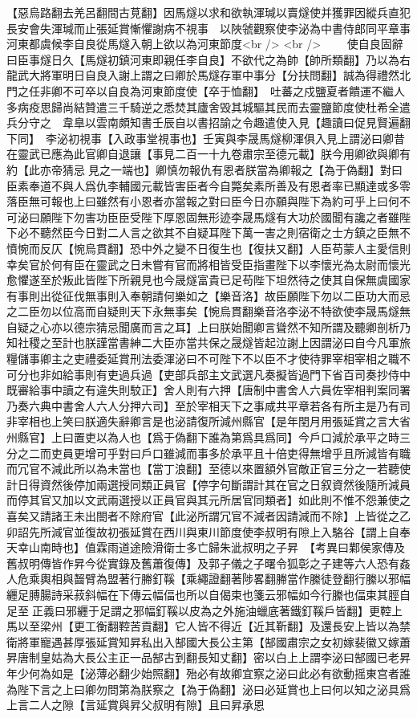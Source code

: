 【惡烏路翻去羌呂翻間古莧翻】因馬燧以求和欲執渾瑊以賣燧使并獲罪因縱兵直犯長安會失渾瑊而止張延賞慚懼謝病不視事　以陜虢觀察使李泌為中書侍郎同平章事河東都虞候李自良從馬燧入朝上欲以為河東節度<br />
<br />
　　使自良固辭曰臣事燧日久【馬燧初鎮河東即親任李自良】不欲代之為帥【帥所類翻】乃以為右龍武大將軍明日自良入謝上謂之曰卿於馬燧存軍中事分【分扶問翻】誠為得禮然北門之任非卿不可卒以自良為河東節度使【卒于恤翻】　吐蕃之戍鹽夏者饋運不繼人多病疫思歸尚結贊遣三千騎逆之悉焚其廬舍毁其城驅其民而去靈鹽節度使杜希全遣兵分守之　韋臯以雲南頗知書壬辰自以書招諭之令趣遣使入見【趣讀曰促見賢遍翻下同】　李泌初視事【入政事堂視事也】壬寅與李晟馬燧柳渾俱入見上謂泌曰卿昔在靈武已應為此官卿自退讓【事見二百一十九卷肅宗至德元載】朕今用卿欲與卿有約【此亦帝猜忌見之一端也】卿慎勿報仇有恩者朕當為卿報之【為于偽翻】對曰臣素奉道不與人爲仇李輔國元載皆害臣者今自斃矣素所善及有恩者率已顯達或多零落臣無可報也上曰雖然有小恩者亦當報之對曰臣今日亦願與陛下為約可乎上曰何不可泌曰願陛下勿害功臣臣受陛下厚恩固無形迹李晟馬燧有大功於國聞有讒之者雖陛下必不聽然臣今日對二人言之欲其不自疑耳陛下萬一害之則宿衛之士方鎮之臣無不憤惋而反仄【惋烏貫翻】恐中外之變不日復生也【復扶又翻】人臣苟蒙人主愛信則幸矣官於何有臣在靈武之日未嘗有官而將相皆受臣指畫陛下以李懷光為太尉而懷光愈懼遂至於叛此皆陛下所親見也今晟燧富貴已足苟陛下坦然待之使其自保無虞國家有事則出從征伐無事則入奉朝請何樂如之【樂音洛】故臣願陛下勿以二臣功大而忌之二臣勿以位高而自疑則天下永無事矣【惋烏貫翻樂音洛李泌不特欲使李晟馬燧無自疑之心亦以德宗猜忌聞廣而言之耳】上曰朕始聞卿言聳然不知所謂及聽卿剖析乃知社稷之至計也朕謹當書紳二大臣亦當共保之晟燧皆起泣謝上因謂泌曰自今凡軍旅糧儲事卿主之吏禮委延賞刑法委渾泌曰不可陛下不以臣不才使待罪宰相宰相之職不可分也非如給事則有吏過兵過【吏部兵部主文武選凡奏擬皆過門下省百司奏抄侍中既審給事中讀之有違失則駮正】舍人則有六押【唐制中書舍人六員佐宰相判案同署乃奏六典中書舍人六人分押六司】至於宰相天下之事咸共平章若各有所主是乃有司非宰相也上笑曰朕適失辭卿言是也泌請復所減州縣官【是年閏月用張延賞之言大省州縣官】上曰置吏以為人也【爲于偽翻下誰為第爲具爲同】今戶口減於承平之時三分之二而吏員更增可乎對曰戶口雖減而事多於承平且十倍吏得無增乎且所減皆有職而冗官不減此所以為未當也【當丁浪翻】至德以來置額外官敵正官三分之一若聽使計日得資然後停加兩選授同類正員官【停字句斷謂計其在官之日叙資然後隨所減員而停其官又加以文武兩選授以正員官與其元所居官同類者】如此則不惟不怨兼使之喜矣又請諸王未出閤者不除府官【此泌所謂冗官不減者因請減而不除】上皆從之乙卯詔先所減官並復故初張延賞在西川與東川節度使李叔明有隙上入駱谷【謂上自奉天幸山南時也】值霖雨道途險滑衛士多亡歸朱泚叔明之子昇　【考異曰鄴侯家傳及舊叔明傳皆作昇今從實錄及舊蕭復傳】及郭子儀之子曙令狐彰之子建等六人恐有姦人危乘輿相與齧臂為盟著行幐釘鞵【乘繩證翻著陟畧翻幐當作縢徒登翻行縢以邪幅纒足膊腸詩采菽斜幅在下傳云幅偪也所以自偈束也箋云邪幅如今行縢也偪束其脛自足至正義曰邪纒于足謂之邪幅釘鞵以皮為之外施油蠟底著鐵釘鞵戶皆翻】更鞚上馬以至梁州【更工衡翻鞚苦貢翻】它人皆不得近【近其靳翻】及還長安上皆以為禁衛將軍寵遇甚厚張延賞知昇私出入郜國大長公主第【郜國肅宗之女初嫁裴徽又嫁蕭昇唐制皇姑為大長公主正一品郜古到翻長知丈翻】密以白上上謂李泌曰郜國已老昇年少何為如是【泌薄必翻少始照翻】殆必有故卿宜察之泌曰此必有欲動摇東宫者誰為陛下言之上曰卿勿問第為朕察之【為于偽翻】泌曰必延賞也上曰何以知之泌具爲上言二人之隙【言延賞與昇父叔明有隙】且曰昇承恩